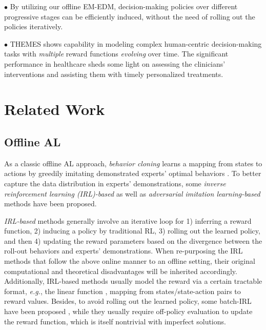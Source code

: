 \documentclass{article}
\begin{document}
\noindent $\bullet$ By utilizing our offline EM-EDM, decision-making policies over different progressive stages can be efficiently induced, without the need of rolling out the policies iteratively.

\noindent $\bullet$ THEMES shows capability in modeling complex human-centric decision-making tasks with \emph{multiple} reward functions \emph{evolving} over time. The significant performance in healthcare sheds some light on assessing the clinicians' interventions and assisting them with timely personalized treatments.


\section{Related Work}


\subsection{Offline AL}

As a classic offline AL approach, \emph{behavior cloning} \cite{syed2012imitation,raza2012teaching} learns a mapping from states to actions by greedily imitating demonstrated experts' optimal behaviors \cite{pomerleau1991efficient}. To better capture the data distribution in experts' demonstrations, some \textit{inverse reinforcement learning (IRL)-based} \cite{abbeel2004apprenticeship,ziebart2008maximum} as well as \textit{adversarial imitation learning-based} \cite{ho2016generative} methods have been proposed. 

\emph{IRL-based} methods generally involve an iterative loop for 1) inferring a reward function, 2) inducing a policy by traditional RL, 3) rolling out the learned policy, and then 4) updating the reward parameters based on the divergence between the roll-out behaviors and experts' demonstrations. When re-purposing the IRL methods that follow the above online manner to an offline setting, their original computational and theoretical disadvantages will be inherited accordingly. Additionally, IRL-based methods usually model the reward via a certain tractable format, \textit{e.g.}, the linear function \cite{abbeel2004apprenticeship,ziebart2008maximum,babes2011apprenticeship}, mapping from states/state-action pairs to reward values. Besides, to avoid rolling out the learned policy, some batch-IRL have been proposed \cite{raghu2017continuous}, while they usually require off-policy evaluation to update the reward function, which is itself nontrivial with imperfect solutions. 
\end{document}
